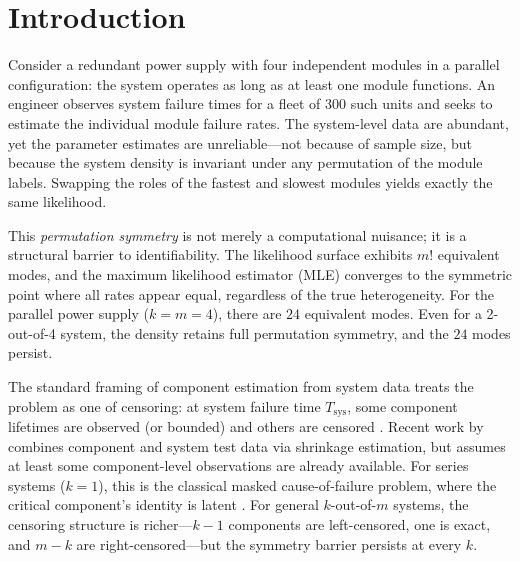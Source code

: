 \documentclass[12pt]{article}
\newcommand{\Tsys}{T_{\mathrm{sys}}}
\begin{document}
\section{Introduction}\label{sec:intro}

Consider a redundant power supply with four independent modules in a parallel
configuration: the system operates as long as at least one module functions.
An engineer observes system failure times for a fleet of 300 such units and
seeks to estimate the individual module failure rates.  The system-level
data are abundant, yet the parameter estimates are unreliable---not because
of sample size, but because the system density is invariant under any
permutation of the module labels.  Swapping the roles of the fastest and
slowest modules yields exactly the same likelihood.

This \emph{permutation symmetry} is not merely a computational nuisance; it
is a structural barrier to identifiability.  The likelihood surface exhibits
$m!$ equivalent modes, and the maximum likelihood estimator (MLE) converges
to the symmetric point where all rates appear equal, regardless of the true
heterogeneity.  For the parallel power supply ($k = m = 4$), there are $24$
equivalent modes.  Even for a 2-out-of-4 system, the density retains full
permutation symmetry, and the $24$ modes persist.

The standard framing of component estimation from system data treats the
problem as one of censoring: at system failure time $\Tsys$, some component
lifetimes are observed (or bounded) and others are censored
\citep{BarlowProschan1975, LawlessBook2003}.
Recent work by \citet{QiangPena2025} combines component and system test
data via shrinkage estimation, but assumes at least some component-level
observations are already available.  For series systems ($k=1$),
this is the classical masked cause-of-failure problem, where the critical
component's identity is latent \citep{Miyakawa1984, LinUsherGuess1993,
Usher1996, KunduBasu2000}.  For
general $k$-out-of-$m$ systems, the censoring structure is richer---$k-1$
components are left-censored, one is exact, and $m-k$ are
right-censored---but the symmetry barrier persists at every $k$.
\end{document}
